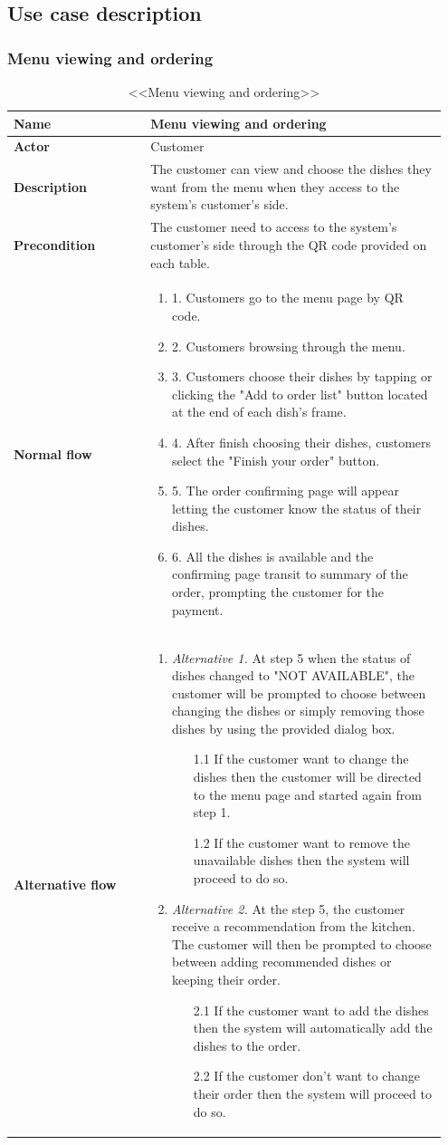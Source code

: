 \documentclass[a4paper,11pt]{extarticle}
\newcommand\tabularhead[2]{
\begin{table}[htbp]
  \caption{<<#1>>}
  \begin{tabular}{|p{0.3\linewidth}|p{0.65\linewidth}|}
    \hline 
    \textbf{Name} & #1 \\
    \hline
    \textbf{Actor} & #2 \\
    \hline}
\newcommand\addrow[2]{\textbf{#1} &#2\\ \hline}
\newcommand\addmulrow[2]{ \begin{minipage}[t][][t]{\linewidth}\textbf{#1}\end{minipage}%
     &\begin{minipage}[t][][t]{\linewidth}
      \begin{enumerate}[wide=0pt] #2   \end{enumerate}
      \smallskip
      \end{minipage} \\ 
      \hline }
\newenvironment{usecase}{\tabularhead}
{\hline\end{tabular}\end{table}}
\begin{document}
\subsection{Use case description}
\subsubsection{Menu viewing and ordering}
\begin{usecase}{Menu viewing and ordering}{Customer}
    \addrow{Description}{The customer can view and choose the dishes they want from the menu when they access to the system's customer's side.}
    \addrow{Precondition}{The customer need to access to the system's customer's side through the QR code provided on each table.}
    \addmulrow{Normal flow}{
        \item[1.] Customers go to the menu page by QR code.
        \item[2.] Customers browsing through the menu.
        \item[3.] Customers choose their dishes by tapping or clicking the "Add to order list" button located at the end of each dish's frame.
        \item[4.] After finish choosing their dishes, customers select the "Finish your order" button.
        \item[5.] The order confirming page will appear letting the customer know the status of their dishes.
        \item[6.] All the dishes is available and the confirming page transit to summary of the order, prompting the customer for the payment.}
    \addmulrow{Alternative flow}{
        \item[\emph{Alternative 1.}] At step 5 when the status of dishes changed to "NOT AVAILABLE", the customer will be prompted to choose between changing the dishes or simply removing those dishes by using the provided dialog box.
        \begin{enumerate}[]
            \item[1.1] If the customer want to change the dishes then the customer will be directed to the menu page and started again from step 1.
            \item[1.2] If the customer want to remove the unavailable dishes then the system will proceed to do so.
        \end{enumerate}
        \item[\emph{Alternative 2.}] At the step 5, the customer receive a recommendation from the kitchen. The customer will then be prompted to choose between adding recommended dishes or keeping their order.
        \begin{enumerate}
            \item[2.1] If the customer want to add the dishes then the system will automatically add the dishes to the order.
            \item[2.2] If the customer don't want to change their order then the system will proceed to do so.
        \end{enumerate}
        }
\end{usecase}
\end{document}
